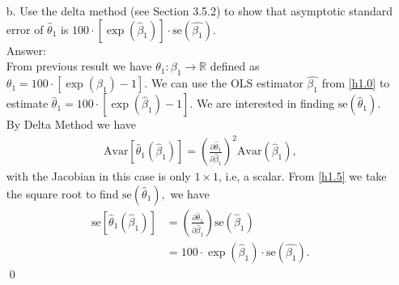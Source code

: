 \documentclass[10pt]{article}
\newcommand{\Av}{\text{Avar}}
\newcommand{\se}{\text{se}}
\begin{document}
\begin{enumerate}
\item[b.] Use the delta method (see Section 3.5.2) to show that asymptotic standard error of $\hat{\theta}_1$ is $100\cdot[\exp(\hat{\beta}_1)]\cdot \se(\hat{\beta_1})$.
\\ Answer:\\
From previous result we have $\theta_1:\beta_1\to\mathbb{R}$ defined as $\theta_1=100\cdot[\exp{(\beta_1)}-1].$ We can use the OLS estimator $\hat{\beta_1}$ from \eqref{h1.0} to estimate $\hat{\theta}_1=100\cdot[\exp(\hat{\beta}_1)-1]$. We are interested in finding $\se(\hat{\theta}_1).$ By Delta Method we have
\begin{align}
    \Av[\hat{\theta}_1(\hat{\beta}_1)]=\left(\frac{\partial\hat{\theta}_1}{\partial \hat{\beta}_1} \right)^2 \Av(\hat{\beta}_1), \label{h1.5}
\end{align}
with the Jacobian in this case is only $1\times 1$, i.e, a scalar. From \eqref{h1.5} we take the square root to find $\se(\hat{\theta}_1),$ we have
\begin{align*}
    \se[\hat{\theta}_1(\hat{\beta}_1)]&=\left(\frac{\partial\hat{\theta}_1}{\partial \hat{\beta}_1} \right) \se(\hat{\beta}_1) \\
    &=100\cdot\exp(\hat{\beta}_1)\cdot \se(\hat{\beta_1}).
\end{align*}\qed


\end{enumerate}
\end{document}
